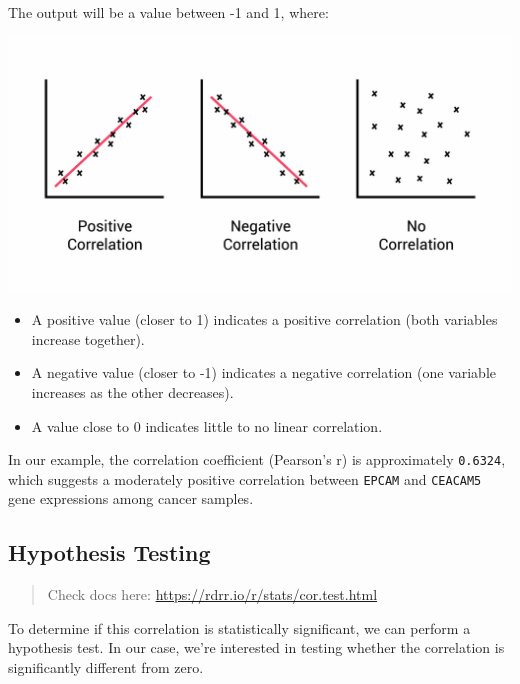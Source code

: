 \documentclass[
]{book}
\newenvironment{Shaded}{\begin{snugshade}}{\end{snugshade}}
\newcommand{\CommentTok}[1]{\textcolor[rgb]{0.56,0.35,0.01}{\textit{#1}}}
\newcommand{\FunctionTok}[1]{\textcolor[rgb]{0.13,0.29,0.53}{\textbf{#1}}}
\newcommand{\NormalTok}[1]{#1}
\newcommand{\OtherTok}[1]{\textcolor[rgb]{0.56,0.35,0.01}{#1}}
\newcommand{\SpecialCharTok}[1]{\textcolor[rgb]{0.81,0.36,0.00}{\textbf{#1}}}
\begin{document}
The output will be a value between -1 and 1, where:

\includegraphics{images/cor.png}

\begin{itemize}
\item
  A positive value (closer to 1) indicates a positive correlation (both variables increase together).
\item
  A negative value (closer to -1) indicates a negative correlation (one variable increases as the other decreases).
\item
  A value close to 0 indicates little to no linear correlation.
\end{itemize}

In our example, the correlation coefficient (Pearson's r) is approximately \texttt{0.6324}, which suggests a moderately positive correlation between \texttt{EPCAM} and \texttt{CEACAM5} gene expressions among cancer samples.

\hypertarget{hypothesis-testing}{%
\subsection{Hypothesis Testing}\label{hypothesis-testing}}

\begin{quote}
Check docs here: \url{https://rdrr.io/r/stats/cor.test.html}
\end{quote}

To determine if this correlation is statistically significant, we can perform a hypothesis test. In our case, we're interested in testing whether the correlation is significantly different from zero.

\begin{Shaded}
\end{Shaded}
\end{document}

